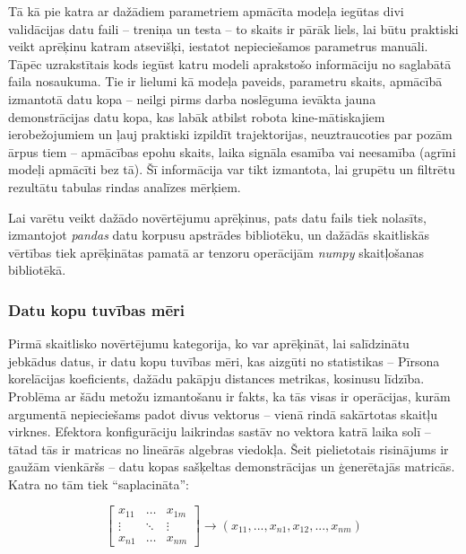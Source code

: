 \documentclass[12pt, a4paper]{article}
\numberwithin{equation}{section} %
\begin{document}
Tā kā pie katra ar dažādiem parametriem apmācīta modeļa iegūtas divi validācijas datu faili -- treniņa un testa -- to skaits ir pārāk liels, lai būtu praktiski veikt aprēķinu katram atsevišķi, iestatot nepieciešamos parametrus manuāli. Tāpēc uzrakstītais kods iegūst katru modeli aprakstošo informāciju no saglabātā faila nosaukuma. Tie ir lielumi kā modeļa paveids, parametru skaits, apmācībā izmantotā datu kopa -- neilgi pirms darba noslēguma ievākta jauna demonstrācijas datu kopa, kas labāk atbilst robota kine-mātiskajiem ierobežojumiem un ļauj praktiski izpildīt trajektorijas, neuztraucoties par pozām ārpus tiem -- apmācības epohu skaits, laika signāla esamība vai neesamība (agrīni modeļi apmācīti bez tā). Šī informācija var tikt izmantota, lai grupētu un filtrētu rezultātu tabulas rindas analīzes mērķiem.

Lai varētu veikt dažādo novērtējumu aprēķinus, pats datu fails tiek nolasīts, izmantojot \textit{pandas} datu korpusu apstrādes bibliotēku, un dažādās skaitliskās vērtības tiek aprēķinātas pamatā ar tenzoru operācijām \textit{numpy} skaitļošanas bibliotēkā.

\subsubsection{Datu kopu tuvības mēri}

Pirmā skaitlisko novērtējumu kategorija, ko var aprēķināt, lai salīdzinātu jebkādus datus, ir datu kopu tuvības mēri, kas aizgūti no statistikas -- Pīrsona korelācijas koeficients, dažādu pakāpju distances metrikas, kosinusu līdzība. Problēma ar šādu metožu izmantošanu ir fakts, ka tās visas ir operācijas, kurām argumentā nepieciešams padot divus vektorus -- vienā rindā sakārtotas skaitļu virknes. Efektora konfigurāciju laikrindas sastāv no vektora katrā laika solī -- tātad tās ir matricas no lineārās algebras viedokļa. Šeit pielietotais risinājums ir gaužām vienkāršs -- datu kopas sašķeltas demonstrācijas un ģenerētajās matricās. Katra no tām tiek ``saplacināta'':

\begin{equation}
    \begin{bmatrix}
        x_{11} & \ldots & x_{1m} \\
        \vdots & \ddots & \vdots \\
        x_{n1} & \ldots & x_{nm}
    \end{bmatrix}
    \rightarrow
    (x_{11}, ..., x_{n1}, x_{12}, ..., x_{nm})
\end{equation}
\end{document}
